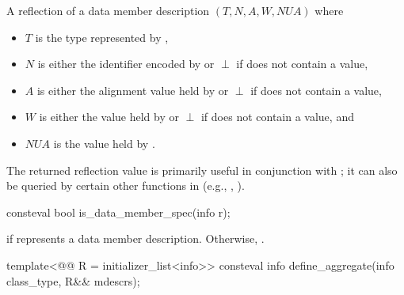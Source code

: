 \begin{itemdescr}
\pnum
\returns
A reflection of a data member description
$(T, N, A, W, \mathit{NUA})$ where
\begin{itemize}
\item
  $T$ is the type represented by ,
\item
  $N$ is either the identifier encoded by 
  or $\perp$ if  does not contain a value,
\item
  $A$ is either the alignment value held by 
  or $\perp$ if  does not contain a value,
\item
  $W$ is either the value held by 
  or $\perp$ if  does not contain a value, and
\item
  $\mathit{NUA}$ is the value held by .
\end{itemize}
\begin{note}
The returned reflection value is primarily useful
in conjunction with ;
it can also be queried by certain other functions in 
(e.g., , ).
\end{note}
\end{itemdescr}

%
\begin{itemdecl}
consteval bool is_data_member_spec(info r);
\end{itemdecl}

\begin{itemdescr}
\pnum
\returns
{} if  represents a data member description.
Otherwise, .
\end{itemdescr}

%
\begin{itemdecl}
template<@@ R = initializer_list<info>>
  consteval info define_aggregate(info class_type, R&& mdescrs);
\end{itemdecl}

